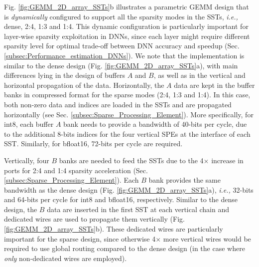 Fig. \ref{fig:GEMM_2D_array_SSTs}b illustrates a parametric GEMM design that is \textit{dynamically} configured to support all the sparsity modes in the SSTs, \emph{i.e.,} dense, 2:4, 1:3 and 1:4.
This dynamic configuration is particularly important for layer-wise sparsity exploitation in DNNs, since each layer might require different sparsity level for optimal trade-off between DNN accuracy and speedup (Sec. \ref{subsec:Performance_estimation_DNNs}).
We note that the implementation is similar to the dense design (Fig. \ref{fig:GEMM_2D_array_SSTs}a), with main differences lying in the design of buffers $A$ and $B$, as well as in the vertical and horizontal propagation of the data.
Horizontally, the $A$ data are kept in the buffer banks in compressed format for the sparse modes (2:4, 1:3 and 1:4).
In this case, both non-zero data and indices are loaded in the SSTs and are propagated horizontally (see Sec. \ref{subsec:Sparse_Processing_Element}).
More specifically, for int8, each buffer $A$ bank needs to provide a bandwidth of 40-bits per cycle, due to the additional 8-bits indices for the four vertical SPEs at the interface of each SST.
Similarly, for bfloat16, 72-bits per cycle are required.


Vertically, four $B$ banks are needed to feed the SSTs due to the 4$\times$ increase in ports for 2:4 and 1:4 sparsity acceleration (Sec. \ref{subsec:Sparse_Processing_Element}).
Each $B$ bank provides the same bandwidth as the dense design (Fig. \ref{fig:GEMM_2D_array_SSTs}a), \emph{i.e.,} 32-bits and 64-bits per cycle for int8 and bfloat16, respectively.
Similar to the dense design, the $B$ data are inserted in the first SST at each vertical chain and dedicated wires are used to propagate them vertically (Fig. \ref{fig:GEMM_2D_array_SSTs}b).
These dedicated wires are particularly important for the sparse design, since otherwise 4$\times$ more vertical wires would be required to use global routing compared to the dense design (in the case where \textit{only} non-dedicated wires are employed).




